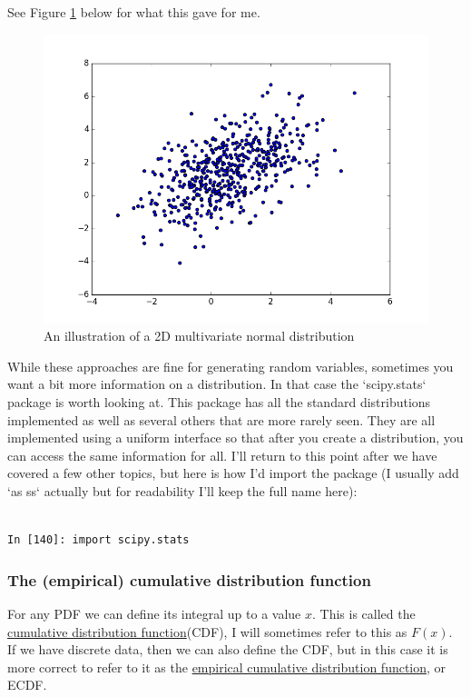 \documentclass[a4paper,10pt]{article}
\begin{document}
See Figure \ref{fig:mgauss} below for what this gave for me.
\begin{figure}[!h]
\includegraphics[width=\textwidth]{multigauss-example.png}
\caption{An illustration of a 2D multivariate normal distribution }
\label{fig:mgauss}
\end{figure}

While these approaches are fine for generating random variables, sometimes you want a bit more information on a distribution. In that case the `scipy.stats` package is worth looking at. This package has all the standard distributions implemented as well as several others that are more rarely seen. They are all implemented using a uniform interface so that after you create a distribution, you can access the same information for all. I'll return to this point after we have covered a few other topics, but here is how I'd import the package (I usually add `as ss` actually but for readability I'll keep the full name here):
\begin{lstlisting}

In [140]: import scipy.stats 
\end{lstlisting}


\subsubsection{ The (empirical) cumulative distribution function}

For any PDF we can define its integral up to a value $x$. This is called the \href{https://en.wikipedia.org/wiki/Cumulative_distribution_function}{cumulative distribution function}(CDF), I will sometimes refer to this as $F(x)$. If we have discrete data, then we can also define the CDF, but in this case it is more correct to refer to it as the \href{https://en.wikipedia.org/wiki/Empirical_distribution_function}{empirical cumulative distribution function}, or ECDF.
\end{document}
